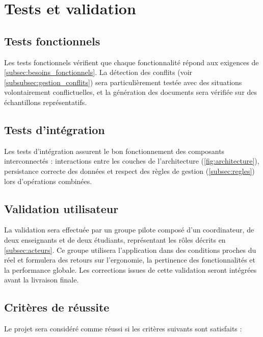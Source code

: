 \documentclass[12pt,a4paper]{article}
\begin{document}
\section{Tests et validation}
\label{sec:tests}

\subsection{Tests fonctionnels}
\label{subsec:tests_fonctionnels}

Les tests fonctionnels vérifient que chaque fonctionnalité répond aux exigences
de \ref{subsec:besoins_fonctionnels}. La détection des conflits (voir
\ref{subsubsec:gestion_conflits}) sera particulièrement testée avec des
situations volontairement conflictuelles, et la génération des documents sera
vérifiée sur des échantillons représentatifs.

\subsection{Tests d'intégration}
\label{subsec:tests_integration}
Les tests d'intégration assurent le bon fonctionnement
des composants interconnectés : interactions entre les couches de l'architecture
(\ref{fig:architecture}), persistance correcte des données et respect des règles de gestion
(\ref{subsec:regles}) lors d'opérations combinées.

\subsection{Validation utilisateur}
\label{subsec:validation_utilisateur}

La validation sera effectuée par un groupe pilote composé d'un coordinateur, de
deux enseignants et de deux étudiants, représentant les rôles décrits en
\ref{subsec:acteurs}. Ce groupe utilisera l'application dans des conditions
proches du réel et formulera des retours sur l'ergonomie, la pertinence des
fonctionnalités et la performance globale. Les corrections issues de cette
validation seront intégrées avant la livraison finale.

\subsection{Critères de réussite}
\label{subsec:criteres_reussite}

Le projet sera considéré comme réussi si les critères suivants sont satisfaits :
\end{document}

